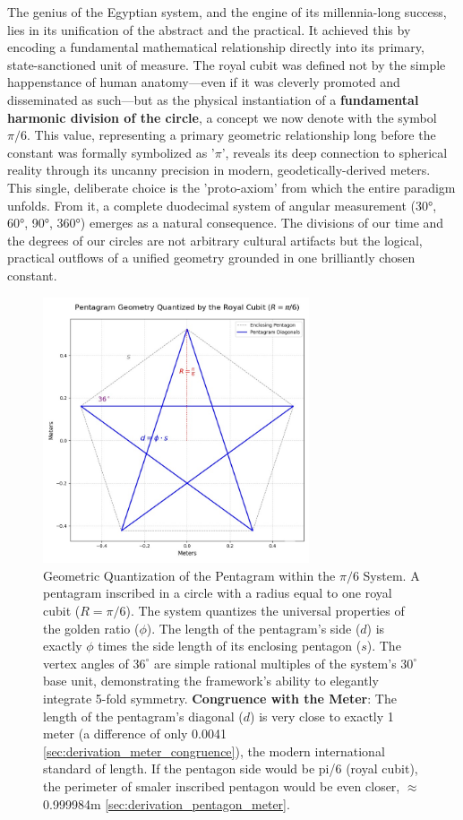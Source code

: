 \documentclass[11pt]{article}
\begin{document}
The genius of the Egyptian system, and the engine of its millennia-long success, lies in its unification of the abstract and the practical. It achieved this by encoding a fundamental mathematical relationship directly into its primary, state-sanctioned unit of measure. The royal cubit was defined not by the simple happenstance of human anatomy—even if it was cleverly promoted and disseminated as such—but as the physical instantiation of a \textbf{fundamental harmonic division of the circle}, a concept we now denote with the symbol $\pi/6$. This value, representing a primary geometric relationship long before the constant was formally symbolized as '$\pi$', reveals its deep connection to spherical reality through its uncanny precision in modern, geodetically-derived meters. This single, deliberate choice is the 'proto-axiom' from which the entire paradigm unfolds. From it, a complete duodecimal system of angular measurement (30°, 60°, 90°, 360°) emerges as a natural consequence. The divisions of our time and the degrees of our circles are not arbitrary cultural artifacts but the logical, practical outflows of a unified geometry grounded in one brilliantly chosen constant.

\begin{figure}[h!]
\centering
\includegraphics[width=0.7\textwidth]{figures/pentagram-fig.jpeg}
\caption{Geometric Quantization of the Pentagram within the $\pi/6$ System. A pentagram inscribed in a circle with a radius equal to one royal cubit ($R = \pi/6$). The system quantizes the universal properties of the golden ratio ($\phi$). The length of the pentagram's side ($d$) is exactly $\phi$ times the side length of its enclosing pentagon ($s$). The vertex angles of $36^\circ$ are simple rational multiples of the system's $30^\circ$ base unit, demonstrating the framework's ability to elegantly integrate 5-fold symmetry. \textbf{Congruence with the Meter}: The length of the pentagram's diagonal ($d$) is very close to exactly 1 meter (a difference of only 0.0041 \ref{sec:derivation_meter_congruence}), the modern international standard of length. If the pentagon side would be pi/6 (royal cubit), the perimeter of smaler inscribed pentagon would be even closer, $\approx$0.999984m \ref{sec:derivation_pentagon_meter}.}
\label{fig:pentagram_quantization}
\end{figure}
\end{document}
